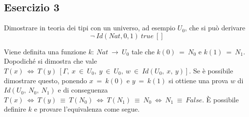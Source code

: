 \subsection{Esercizio 3}
\begin{thm}
	Dimostrare in teoria dei tipi con un universo, ad esempio $U_0$, che si può derivare
	\[\neg~Id(Nat, 0, 1)~true~[]\]
\end{thm}
Viene definita una funzione $k:~Nat~\to~U_0$ tale che $k(0)~=~N_0$ e $k(1)~=~N_1$. Dopodiché si dimostra che vale $T(x)~\iff~T(y)~[\Gamma,~x~\in~U_0,~y~\in~U_0,~w~\in~Id(U_0,~x,~y)]$. Se è possibile dimostrare questo, ponendo $x~=~k(0)$ e $y~=~k(1)$ si ottiene una prova $w$ di $Id(U_0,~N_0,~N_1)$ e di conseguenza $T(x)~\iff~T(y)~\equiv~T(N_0)~\iff~T(N_1)~\equiv~N_0~\iff~N_1~\equiv~False$. È possibile definire $k$ e provare l'equivalenza come segue.
